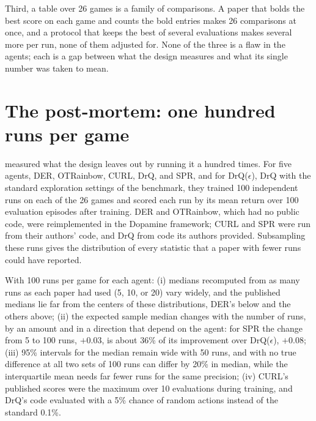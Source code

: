 \begin{refsection}
Third, a table over 26 games is a family of comparisons. A paper that bolds the best score on each game and counts the bold entries makes 26 comparisons at once, and a protocol that keeps the best of several evaluations makes several more per run, none of them adjusted for. None of the three is a flaw in the agents; each is a gap between what the design measures and what its single number was taken to mean.

\section{The post-mortem: one hundred runs per game}\label{sec:aggregates:postmortem}

\Textcite{AgarwalEtAl2021} measured what the design leaves out by running it a hundred times. For five agents, DER, OTRainbow, CURL, DrQ, and SPR, and for DrQ($\epsilon$), DrQ with the standard exploration settings of the benchmark, they trained 100 independent runs on each of the 26 games and scored each run by its mean return over 100 evaluation episodes after training. DER and OTRainbow, which had no public code, were reimplemented in the Dopamine framework; CURL and SPR were run from their authors' code, and DrQ from code its authors provided. Subsampling these runs gives the distribution of every statistic that a paper with fewer runs could have reported.

\begin{finding}\label{fd:aggregates:precipice}
With 100 runs per game for each agent:
(i) medians recomputed from as many runs as each paper had used (5, 10, or 20) vary widely, and the published medians lie far from the centers of these distributions, DER's below and the others above;
(ii) the expected sample median changes with the number of runs, by an amount and in a direction that depend on the agent: for SPR the change from 5 to 100 runs, $+0.03$, is about 36\% of its improvement over DrQ($\epsilon$), $+0.08$;
(iii) 95\% intervals for the median remain wide with 50 runs, and with no true difference at all two sets of 100 runs can differ by 20\% in median, while the interquartile mean needs far fewer runs for the same precision;
(iv) CURL's published scores were the maximum over 10 evaluations during training, and DrQ's code evaluated with a 5\% chance of random actions instead of the standard 0.1\%.
\end{finding}


\end{refsection}
